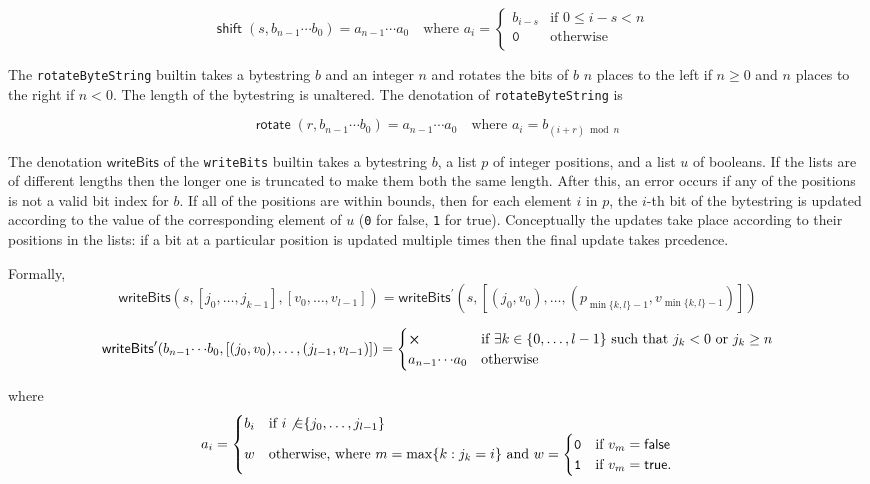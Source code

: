 $$
\mathsf{shift}\;(s,b_{n-1} \cdots b_0) =
  a_{n-1} \cdots a_0 \quad \text{where }
  a_i = \begin{cases}
     b_ {i-s} & \text{if $0 \leq i-s < n$ }\\
     \texttt{0} & \text{otherwise}\\
\end{cases}
$$

\label{note:rotate}
The \texttt{rotateByteString} builtin takes a bytestring $b$ and an integer $n$ and
rotates the bits of $b$ $n$ places to the left if $n \geq 0$ and $n$ places to
the right if $n < 0$.  The length of the bytestring is unaltered.  The denotation of
\texttt{rotateByteString} is 

$$
\mathsf{rotate}\;(r, b_{n-1} \cdots b_0) = a_{n-1}\cdots a_0 \quad\text{where $a_i = b_{(i+r)\bmod n}$}
$$

\label{note:writebits}

The denotation $\mathsf{writeBits}$ of the \texttt{writeBits} builtin takes a
bytestring $b$, a list $p$ of integer positions, and a list $u$ of booleans.  If
the lists are of different lengths then the longer one is truncated to make them
both the same length.  After this, an error occurs if any of the positions is
not a valid bit index for $b$.  If all of the positions are within bounds, then
for each element $i$ in $p$, the $i$-th bit of the bytestring is updated
according to the value of the corresponding element of $u$ (\texttt{0}
for \textsf{false}, \texttt{1} for \textsf{true}).  Conceptually the updates
take place according to their positions in the lists: if a bit at a particular
position is updated multiple times then the final update takes prcedence.

\smallskip
\noindent Formally, 
$$
\mathsf{writeBits}(s, [j_0 , \ldots, j_{k-1}], [v_0, \ldots, v_{l-1}]) =
    \mathsf{writeBits}^{\prime} (s, [(j_0, v_0) , \ldots, (p_{\min\{k,l\}-1}, v_{\min\{k,l\}-1})])
$$

$$
\mathsf{writeBits}^{\prime}(b_{n-1}{\cdots}b_0, [(j_0,v_0), \ldots, (j_{l-1}, v_{l-1})]) = 
\begin{cases}
\errorX & \text{if $\exists k \in \{0, \ldots, l-1\}$ such that $j_k<0$ or $j_k \geq n$} \\
a_{n-1}{\cdots}a_0 & \text{otherwise}
\end{cases}
$$

\noindent where
$$
  a_i =
  \begin{cases}
    b_i & \text{if $i \not{\in} \{j_0, \ldots, j_{l-1}\}$}\\
    w & \text{otherwise, where $m = \max\{k : j_k = i\}$ and }
      w=\begin{cases}
      \mathtt{0} & \text{if $v_m = \mathsf{false}$}\\
      \mathtt{1} & \text{if $v_m = \mathsf{true}$}.
    \end{cases}
  \end{cases}
$$
